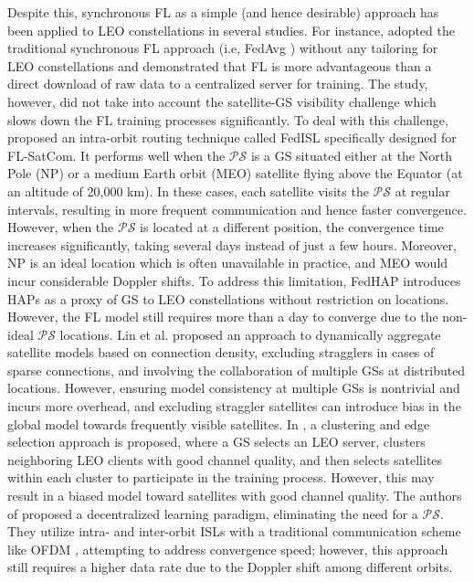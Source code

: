 \documentclass[letter,journal]{IEEEtran}
\begin{document}
Despite this, synchronous FL as a simple (and hence desirable) approach has been applied to LEO constellations in several studies. For instance, \cite{chen2022satellite} adopted the traditional synchronous FL approach  (i.e, FedAvg \cite{mcmahan2017communication}) without any tailoring for LEO constellations and demonstrated that FL is more advantageous than a direct download of raw data to a centralized server for training. The study, however, did not take into account the satellite-GS visibility challenge which slows down the FL training processes significantly. To deal with this challenge, \cite{razmi} proposed an intra-orbit routing technique called FedISL specifically designed for FL-SatCom. It performs well when the $\mathcal{PS}$ is a GS situated either at the North Pole (NP) or a medium Earth orbit (MEO) satellite flying above the Equator (at an altitude of 20,000 km). In these cases, each satellite visits the $\mathcal{PS}$ at regular intervals, resulting in more frequent communication and hence faster convergence. However, when the $\mathcal{PS}$ is located at a different position, the convergence time increases significantly, taking several days instead of just a few hours.
Moreover, NP is an ideal location which is often unavailable in practice, and MEO would incur considerable Doppler shifts. To address this limitation, FedHAP \cite{happaper} introduces HAPs as a proxy of GS to LEO constellations without restriction on locations. However, the FL model still requires more than a day to converge due to the non-ideal $\mathcal {PS}$ locations. Lin et al. \cite{lin2022federated} proposed an approach to dynamically aggregate satellite models based on connection density, excluding stragglers in cases of sparse connections, and involving the collaboration of multiple GSs at distributed locations. However, ensuring model consistency at multiple GSs is nontrivial and incurs more overhead, and excluding straggler satellites can introduce bias in the global model towards frequently visible satellites. In \cite{chen2023edge}, a clustering and edge selection approach is proposed, where a GS selects an LEO server, clusters neighboring LEO clients with good channel quality, and then selects satellites within each cluster to participate in the training process. However, this may result in a biased model toward satellites with good channel quality. The authors of \cite{wu2022dsfl} proposed a decentralized learning paradigm, eliminating the need for a $\mathcal {PS}$. They utilize intra- and inter-orbit ISLs with a traditional communication scheme like OFDM \cite{el2019performance}, attempting to address convergence speed; however, this approach still requires a higher data rate due to the Doppler shift among different orbits.
\end{document}
